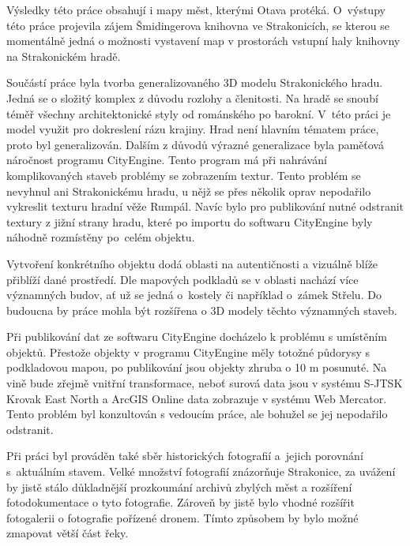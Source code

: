 \documentclass[thesis=M,czech]{FITthesis}[2012/06/26]
\begin{document}
Výsledky této práce obsahují i mapy měst, kterými Otava protéká.  O~výstupy této práce projevila zájem Šmidingerova knihovna ve Strakonicích, se kterou se momentálně jedná o možnosti vystavení map v prostorách vstupní haly knihovny na Strakonickém hradě. 

Součástí práce byla tvorba generalizovaného 3D modelu Strakonického hradu. Jedná se o složitý komplex z důvodu rozlohy a členitosti. Na hradě se snoubí téměř všechny architektonické styly od románského po barokní. V~této práci je model využit pro dokreslení rázu krajiny. Hrad není hlavním tématem práce, proto byl generalizován. Dalším z důvodů výrazné generalizace byla paměťová náročnost programu CityEngine. Tento program má při nahrávání komplikovaných staveb problémy se zobrazením textur. Tento problém se nevyhnul ani Strakonickému hradu, u nějž se přes několik oprav nepodařilo vykreslit texturu hradní věže Rumpál. Navíc bylo pro publikování nutné odstranit textury z jižní strany hradu, které po importu do softwaru CityEngine byly náhodně rozmístěny po~celém objektu.


Vytvoření konkrétního objektu dodá oblasti na autentičnosti a vizuálně blíže přiblíží dané prostředí. Dle mapových podkladů se v oblasti nachází více významných budov, ať už se jedná o~kostely či například o~zámek Střelu. Do budoucna by práce mohla být rozšířena o 3D modely těchto významných staveb. 

Při publikování dat ze softwaru CityEngine docházelo k problému s umístěním objektů. Přestože objekty v programu CityEngine měly totožné půdorysy s podkladovou  mapou, po publikování jsou objekty zhruba o 10 m posunuté. Na vině bude zřejmě vnitřní transformace, neboť surová data jsou v systému S-JTSK Krovak East North a ArcGIS Online data zobrazuje v systému Web Mercator. Tento problém byl konzultován s vedoucím práce, ale bohužel se jej nepodařilo odstranit. 

Při práci byl prováděn také sběr historických fotografií a~jejich porovnání s~aktuálním stavem. Velké množství fotografií znázorňuje Strakonice, za uvážení by jistě stálo důkladnější prozkoumání archivů zbylých měst a rozšíření fotodokumentace o tyto fotografie. Zároveň by jistě bylo vhodné rozšířit fotogalerii o fotografie pořízené dronem. Tímto způsobem by bylo možné zmapovat větší část řeky.
\end{document}

